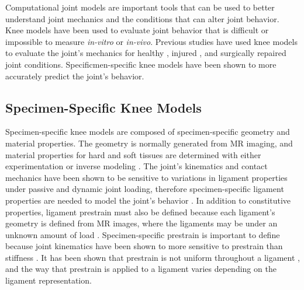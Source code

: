 Computational joint models are important tools that can be used to better understand joint mechanics and the conditions that can alter joint behavior. Knee models have been used to evaluate joint behavior that is difficult or impossible to measure \textit{in-vitro} or \textit{in-vivo}. Previous studies have used knee models to evaluate the joint's mechanics for healthy \citep{blankevoort_validation_1996,pena_three-dimensional_2006}, injured \citep{ali_validation_2016}, and surgically repaired \citep{thompson_biomechanical_2011,amiri_computational_2012,salehghaffari_phenomenological_2015,smith_influence_2016} joint conditions. Specificmen-specific knee models have been shown to more accurately predict the joint's behavior.

\subsection*{Specimen-Specific Knee Models}
Specimen-specific knee models are composed of specimen-specific geometry and material properties. The geometry is normally generated from MR imaging, and material properties for hard and soft tissues are determined with either experimentation \citep{gardiner_subject-specific_2003} or inverse modeling \citep{blankevoort_validation_1996,baldwin_efficient_2009,ewing_estimating_2015,harris_combined_2016}. The joint's kinematics and contact mechanics have been shown to be sensitive to variations in ligament properties under passive \citep{baldwin_efficient_2009,dhaher_effect_2010,ewing_estimating_2015} and dynamic \citep{smith_influence_2016-1} joint loading, therefore specimen-specific ligament properties are needed to model the joint's behavior \citep{ewing_estimating_2015}. In addition to constitutive properties, ligament prestrain must also be defined because each ligament's geometry is defined from MR images, where the ligaments may be under an unknown amount of load \citep{weiss_computational_2001,maas_general_2016}. Specimen-specific prestrain is important to define because joint kinematics have been shown to more sensitive to prestrain than stiffness \citep{baldwin_efficient_2009}. It has been shown that prestrain is not uniform throughout a ligament \citep{hull_strain_1996,gardiner_strain_2001} , and the way that prestrain is applied to a ligament varies depending on the ligament representation.


